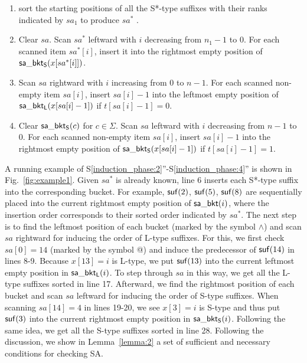 \documentclass[10pt,journal,compsoc]{IEEEtran}
\begin{document}
\begin{enumerate}[S1'']
	\item sort the starting positions of all the S*-type suffixes with their ranks indicated by $sa_1$ to produce $sa^*$ \label{induction_phase:1}.

	\item Clear $sa$. Scan $sa^*$ leftward with $i$ decreasing from $n_1 - 1$ to $0$. For each scanned item $sa^*[i]$, insert it into the rightmost empty position of ${\sf sa\_bkt_S}(x[sa^*[i]])$. \label{induction_phase:2}
	
	\item Scan $sa$ rightward with $i$ increasing from $0$ to $n - 1$. For each scanned non-empty item $sa[i]$, insert $sa[i] - 1$ into the leftmost empty position of ${\sf sa\_bkt_L}(x[sa[i] - 1])$ if $t[sa[i] - 1] = 0$.\label{induction_phase:3}
	
	\item Clear ${\sf sa\_bkt_S}(c)$ for $c \in \Sigma$. Scan $sa$ leftward with $i$ decreasing from $n - 1$ to $0$. For each scanned non-empty item $sa[i]$, insert $sa[i] - 1$ into the rightmost empty position of ${\sf sa\_bkt_S}(x[sa[i] - 1])$ if $t[sa[i] - 1] = 1$.\label{induction_phase:4}
	
\end{enumerate}

A running example of S\ref{induction_phase:2}''-S\ref{induction_phase:4}'' is shown in Fig.~\ref{fig:example1}. Given $sa^*$ is already known, line 6 inserts each S*-type suffix into the corresponding bucket. For example, ${\sf suf}(2)$, ${\sf suf}(5)$, ${\sf suf}(8)$ are sequentially placed into the current rightmost empty position of ${\sf sa\_bkt}(i)$, where the insertion order corresponds to their sorted order indicated by $sa^*$. The next step is to find the leftmost position of each bucket (marked by the symbol $\wedge$) and scan $sa$ rightward for inducing the order of L-type suffixes. For this, we first check $sa[0] = 14$ (marked by the symbol @) and induce the predecessor of ${\sf suf}(14)$ in lines 8-9. Because $x[13] = i$ is L-type, we put ${\sf suf}(13)$ into the current leftmost empty position in ${\sf sa\_bkt_L}(i)$. To step through $sa$ in this way, we get all the L-type suffixes sorted in line 17. Afterward, we find the rightmost position of each bucket and scan $sa$ leftward for inducing the order of S-type suffixes. When scanning $sa[14] = 4$ in lines 19-20, we see $x[3] = i$ is S-type and thus put ${\sf suf}(3)$ into the current rightmost empty position in ${\sf sa\_bkt_S}(i)$. Following the same idea, we get all the S-type suffixes sorted in line 28. Following the discussion, we show in Lemma~\ref{lemma:2} a set of sufficient and necessary conditions for checking SA.
\end{document}
